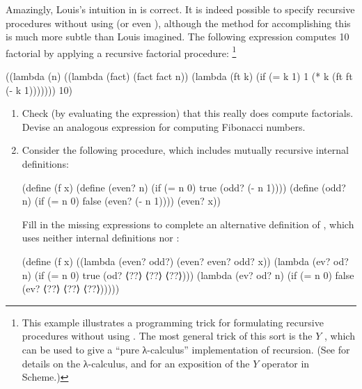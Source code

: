 \begin{exercise}
	\label{Exercise 4.21}
	Amazingly, Louis’s intuition in  is correct.
	It is indeed possible to specify recursive procedures without using  (or even ), although the method for accomplishing this is much more subtle than Louis imagined.
	The following expression computes 10 factorial by applying a recursive factorial procedure:%
	\footnote{
		This example illustrates a programming trick for formulating recursive procedures without using .
		The most general trick of this sort is the \( Y \) , which can be used to give a “pure λ-calculus” implementation of recursion.
		(See  for details on the λ-calculus, and  for an exposition of the \( Y \) operator in Scheme.)
	}
	\begin{scheme}
	  ((lambda (n)
	     ((lambda (fact) (fact fact n))
	      (lambda (ft k) (if (= k 1) 1 (* k (ft ft (- k 1)))))))
	   10)
	\end{scheme}
	\begin{enumerate}[label = \alph*., leftmargin = *]

		\item
			Check (by evaluating the expression) that this really does compute factorials.
			Devise an analogous expression for computing Fibonacci numbers.

		\item
			Consider the following procedure, which includes mutually recursive internal definitions:
			\begin{scheme}
			  (define (f x)
			    (define (even? n)
			      (if (= n 0) true  (odd?  (- n 1))))
			    (define (odd? n)
			      (if (= n 0) false (even? (- n 1))))
			    (even? x))
			\end{scheme}
			Fill in the missing expressions to complete an alternative definition of , which uses neither internal definitions nor :
			\begin{scheme}
			  (define (f x)
			    ((lambda (even? odd?) (even? even? odd? x))
			     (lambda (ev? od? n)
			       (if (= n 0) true (od? ⟨??⟩ ⟨??⟩ ⟨??⟩)))
			     (lambda (ev? od? n)
			       (if (= n 0) false (ev? ⟨??⟩ ⟨??⟩ ⟨??⟩)))))
			\end{scheme}

	\end{enumerate}
\end{exercise}
